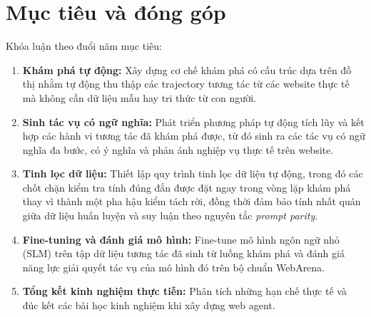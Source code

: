 \section{Mục tiêu và đóng góp}
\label{sec:intro-contrib}

Khóa luận theo đuổi năm mục tiêu:

\begin{enumerate}
  \item[\textbf{O1.}] \textbf{Khám phá tự động:} Xây dựng cơ chế khám phá có cấu trúc dựa trên đồ thị nhằm tự động thu thập các trajectory tương tác từ các website thực tế mà không cần dữ liệu mẫu hay tri thức từ con người.
  \item[\textbf{O2.}] \textbf{Sinh tác vụ có ngữ nghĩa:} Phát triển phương pháp tự động tích lũy và kết hợp các hành vi tương tác đã khám phá được, từ đó sinh ra các tác vụ có ngữ nghĩa đa bước, có ý nghĩa và phản ánh nghiệp vụ thực tế trên website.
  \item[\textbf{O3.}] \textbf{Tinh lọc dữ liệu:} Thiết lập quy trình tinh lọc dữ liệu tự động, trong đó các chốt chặn kiểm tra tính đúng đắn được đặt ngay trong vòng lặp khám phá thay vì thành một pha hậu kiểm tách rời, đồng thời đảm bảo tính nhất quán giữa dữ liệu huấn luyện và suy luận theo nguyên tắc \emph{prompt parity}.
  \item[\textbf{O4.}] \textbf{Fine-tuning và đánh giá mô hình:} Fine-tune mô hình ngôn ngữ nhỏ (SLM) trên tập dữ liệu tương tác đã sinh từ luồng khám phá và đánh giá năng lực giải quyết tác vụ của mô hình đó trên bộ chuẩn WebArena.
  \item[\textbf{O5.}] \textbf{Tổng kết kinh nghiệm thực tiễn:} Phân tích những hạn chế thực tế và đúc kết các bài học kinh nghiệm khi xây dựng web agent.
\end{enumerate}

